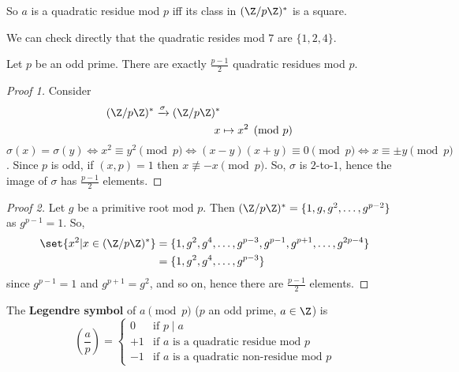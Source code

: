 \documentclass{article}
\newcommand{\legendre}[2]{\genfrac{(}{)}{}{}{#1}{#2}}
\begin{document}
So $a$ is a quadratic residue mod $p$ iff its class in $(\Z / p \Z)^*$ is a square.


We can check directly that %
the quadratic resides mod $7$ are $\{1, 2, 4\}$.

\begin{nlemma}\label{lem:3.1}
    Let $p$ be an odd prime. There are exactly $\frac{p-1}{2}$ quadratic residues mod $p$.
\end{nlemma}

\begin{proof}[Proof 1]
    Consider
    \begin{align*}
        (\Z / p \Z)^* \xrightarrow{\sigma} (\Z/p\Z)^* \\
        x &\mapsto x^2 \pmod{p}
    \end{align*}
    $\sigma(x) = \sigma(y) \iff x^2 \equiv y^2 \pmod{p} \iff (x-y)(x+y) \equiv 0 \pmod{p} \iff x \equiv \pm y \pmod{p}$.
    Since $p$ is odd, if $(x, p) = 1$ then $x \not\equiv -x \pmod{p}$. So, $\sigma$ is $2$-to-$1$, hence the image of $\sigma$ has $\frac{p-1}{2}$ elements.
\end{proof}

\begin{proof}[Proof 2]
    Let $g$ be a primitive root mod $p$. Then $(\Z / p \Z)^* = \{1, g, g^2, \dotsc, g^{p-2}\}$ as $g^{p-1} = 1$.
    So,
    \begin{align*}
        \set{x^2 | x \in (\Z / p\Z)^*} &= \{1, g^2, g^4, \dotsc, g^{p-3}, g^{p-1}, g^{p+1}, \dotsc, g^{2p-4}\} \\
                                      &= \{1, g^2, g^4, \dotsc, g^{p-3}\}
    \end{align*}
    since $g^{p-1} = 1$ and $g^{p+1} = g^2$, and so on, hence there are $\frac{p-1}{2}$ elements.
\end{proof}

\begin{defi}
    The \textbf{Legendre symbol} of $a \pmod{p}$ ($p$ an odd prime, $a \in \Z$) is
    \begin{equation*}
        \legendre{a}{p} =
        \begin{cases}
            0 & \text{if } p \mid a \\
            +1 & \text{if $a$ is a quadratic residue mod $p$} \\
            -1 & \text{if $a$ is a quadratic non-residue mod $p$}
        \end{cases}
    \end{equation*}
\end{defi}
\end{document}

